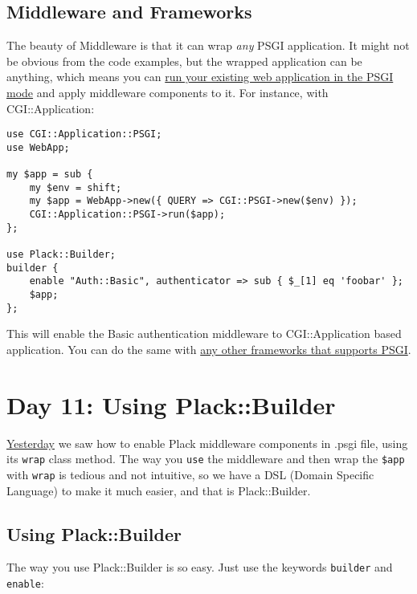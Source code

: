 \section{Middleware and Frameworks}\label{middleware-and-frameworks}

The beauty of Middleware is that it can wrap \emph{any} PSGI
application. It might not be obvious from the code examples, but the
wrapped application can be anything, which means you can
\href{http://advent.plackperl.org/2009/12/day-7-use-web-application-framework-in-psgi.html}{run
your existing web application in the PSGI mode} and apply middleware
components to it. For instance, with CGI::Application:

\begin{lstlisting}
use CGI::Application::PSGI;
use WebApp;

my $app = sub {
    my $env = shift;
    my $app = WebApp->new({ QUERY => CGI::PSGI->new($env) });
    CGI::Application::PSGI->run($app);
};

use Plack::Builder;
builder {
    enable "Auth::Basic", authenticator => sub { $_[1] eq 'foobar' };
    $app;
};
\end{lstlisting}

This will enable the Basic authentication middleware to CGI::Application
based application. You can do the same with
\href{http://plackperl.org/\#frameworks}{any other frameworks that
supports PSGI}.

\chapter{Day 11: Using Plack::Builder}\label{day-11-using-plackbuilder}

\href{http://advent.plackperl.org/2009/12/day-10-using-plack-middleware.html}{Yesterday}
we saw how to enable Plack middleware components in .psgi file, using
its \lstinline!wrap! class method. The way you \lstinline!use! the
middleware and then wrap the \lstinline!$app! with \lstinline!wrap! is
tedious and not intuitive, so we have a DSL (Domain Specific Language)
to make it much easier, and that is Plack::Builder.

\section{Using Plack::Builder}\label{using-plackbuilder}

The way you use Plack::Builder is so easy. Just use the keywords
\lstinline!builder! and \lstinline!enable!:

